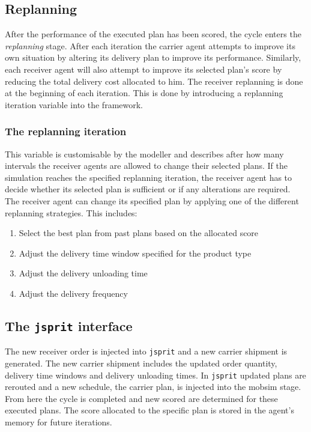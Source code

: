 \subsection{Replanning}
\label{replanning}
After the performance of the executed plan has been scored, the cycle enters the \textit{replanning} stage. After each iteration the carrier agent attempts to improve its own situation by altering its delivery plan to improve its performance. Similarly, each receiver agent will also attempt to improve its selected plan's score by reducing the total delivery cost allocated to him. The receiver replanning is done at the beginning of each iteration. This is done by introducing a replanning iteration variable into the framework. 

\subsubsection{The replanning iteration}
This variable is customisable by the modeller and describes after how many intervals the receiver agents are allowed to change their selected plans. If the simulation reaches the specified replanning iteration, the receiver agent has to decide whether its selected plan is sufficient or if any alterations are required. The receiver agent can change its specified plan by applying one of the different replanning strategies. This includes:
\begin{enumerate}
    \item Select the best plan from past plans based on the allocated score
    \item Adjust the delivery time window specified for the product type
    \item Adjust the delivery unloading time
    \item Adjust the delivery frequency 
\end{enumerate}

\subsection{The \texttt{jsprit} interface}
The new receiver order is injected into \texttt{jsprit} and a new carrier shipment is generated. The new carrier shipment includes the updated order quantity, delivery time windows and delivery unloading times. In \texttt{jsprit} updated plans are rerouted and a new schedule, the carrier plan, is injected into the mobsim stage. From here the cycle is completed and new scored are determined for these executed plans. The score allocated to the specific plan is stored in the agent's memory for future iterations.


